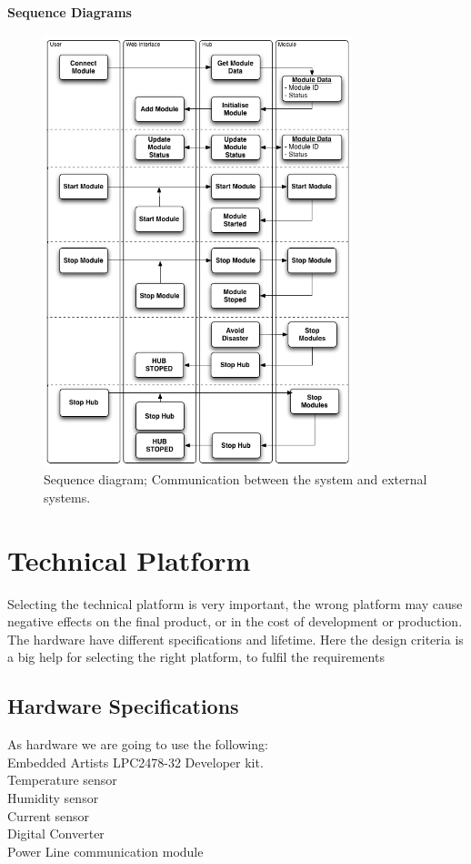 \textbf{Sequence Diagrams}
\begin{figure}[H]
	\begin{centering}
		 \includegraphics[width=0.8\textwidth]{images/SequenceDiagram.png}
		\caption{Sequence diagram; Communication between the system and external systems.}
 	\end{centering}
\end{figure}

\section{Technical Platform}
Selecting the technical platform is very important, the wrong platform may cause negative effects on the final product, or in the cost of development or production. The hardware have different specifications and lifetime. Here the design criteria is a big help for selecting the right platform, to fulfil the requirements
\subsection{Hardware Specifications}
As hardware we are going to use the following: 
\\Embedded Artists LPC2478-32 Developer kit.
\\Temperature sensor
\\Humidity sensor
\\Current sensor
\\Digital Converter
\\Power Line communication module

